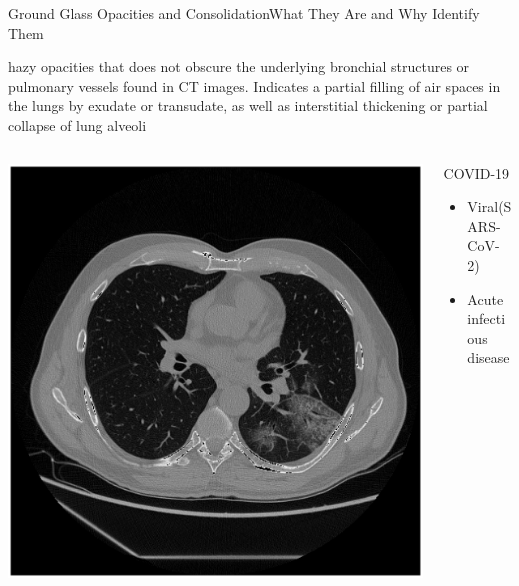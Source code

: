 \documentclass{standalone}
\begin{document}
	\begin{frame}{Ground Glass Opacities and Consolidation}{What They Are and Why Identify Them}
					
	\scriptsize{hazy opacities that does not obscure the underlying bronchial structures or pulmonary vessels found in CT images. Indicates a partial filling of air spaces in the lungs by exudate or transudate, as well as interstitial thickening or partial collapse of lung alveoli}
	
	\vspace{1mm}
	\begin{columns}
		\begin{column}{0.5\textwidth}
				\centering\includegraphics[scale=.12]{./img/GGO.png}			
		\end{column}
		\begin{column}{0.5\textwidth}
					\begin{block}{COVID-19}
					\begin{itemize}
						
						\item Viral(SARS-CoV-2) 
						
						\item Acute infectious disease
						

\end{itemize}
\end{block}
\end{column}
\end{columns}
\end{frame}
\end{document}
